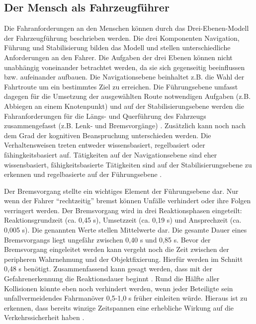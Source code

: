 \subsection{Der Mensch als Fahrzeugführer}\label{Der Mensch als Fahrzzeugführer}
Die Fahranforderungen an den Menschen können durch das Drei-Ebenen-Modell der Fahrzeugführung beschrieben werden. Die drei Komponenten Navigation, Führung und Stabilisierung bilden das Modell und stellen unterschiedliche Anforderungen an den Fahrer. Die Aufgaben der drei Ebenen können nicht unabhängig voneinander betrachtet werden, da sie sich gegenseitig beeinflussen bzw. aufeinander aufbauen. Die Navigationsebene beinhaltet z.B. die Wahl der Fahrtroute um ein bestimmtes Ziel zu erreichen. Die Führungsebene umfasst dagegen für die Umsetzung der ausgewählten Route notwendigen Aufgaben (z.B. Abbiegen an einem Knotenpunkt) und auf der Stabilisierungsebene werden die Fahranforderungen für die Längs- und Querführung des Fahrzeugs zusammengefasst (z.B. Lenk- und Bremsvorgänge) \parencite[S. 16]{Gerstenberger.17.02.2015}. Zusätzlich kann noch nach dem Grad der kognitiven Beanspruchung unterschieden werden. Die Verhaltensweisen treten entweder wissensbasiert, regelbasiert oder fähingkeitsbasiert auf. Tätigkeiten auf der Navigationsebene sind eher wissensbasiert, fähigkeitsbasierte Tätigkeiten sind auf der Stabilisierungsebene zu erkennen und regelbasierte auf der Führungsebene \parencite[S. 45]{Grundl.2005}.

Der Bremsvorgang stellte ein wichtiges Element der Führungsebene dar. Nur wenn der Fahrer \enquote{rechtzeitig} bremst können Unfälle verhindert oder ihre Folgen verringert werden. Der Bremsvorgang wird in drei Reaktionsphasen eingeteilt: Reaktionsgrundzeit (ca. 0,45 s), Umsetzzeit (ca. 0,19 s) und Ansprechzeit (ca. 0,005 s). Die genannten Werte stellen Mittelwerte dar. Die gesamte Dauer eines Bremsvorgangs liegt ungefähr zwischen 0,40 s und 0,85 s. Bevor der Bremsvorgang eingeleitet werden kann vergeht noch die Zeit zwischen der peripheren Wahrnehmung und der Objektfixierung. Hierfür werden im Schnitt 0,48 s benötigt. Zusammenfassend kann gesagt werden, dass mit der Gefahrenerkennung die Reaktionsdauer beginnt \parencite[S.153]{Burg.2017}. Rund die Hälfte aller Kollisionen könnte eben noch verhindert werden, wenn jeder Beteiligte sein unfallvermeidendes Fahrmanöver 0,5-1,0 s früher einleiten würde. Hieraus ist zu erkennen, dass bereits winzige Zeitspannen eine erhebliche Wirkung auf die Verkehrssicherheit haben \parencite[S. 271]{Burg.2017}.

